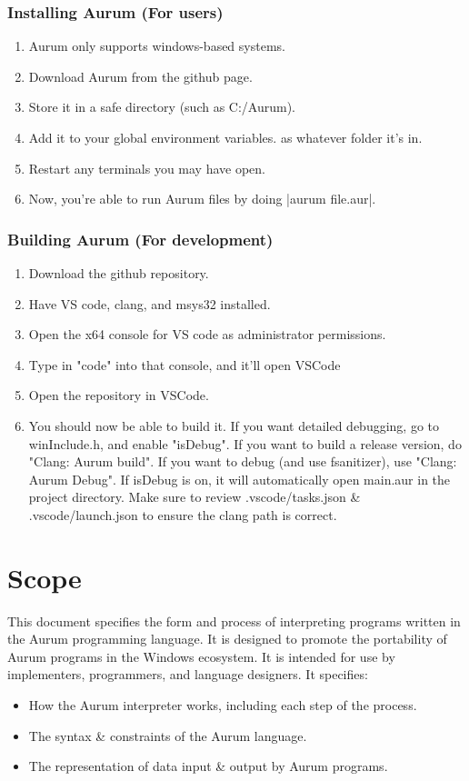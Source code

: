 \documentclass[12pt, letterpaper, oneside]{article}
\begin{document}
		\subsubsection{Installing Aurum (For users)}
		\begin{enumerate}
			\item Aurum only supports windows-based systems.
			\item Download Aurum from the github page.
			\item Store it in a safe directory (such as C:/Aurum).
			\item Add it to your global environment variables. as whatever folder it's in.
			\item Restart any terminals you may have open.
			\item Now, you're able to run Aurum files by doing \spverb|aurum file.aur|.
		\end{enumerate}
		\subsubsection{Building Aurum (For development)}
		\begin{enumerate}
			\item Download the github repository.
			\item Have VS code, clang, and msys32 installed.
			\item Open the x64 console for VS code as administrator permissions.
			\item Type in "code" into that console, and it'll open VSCode
			\item Open the repository in VSCode.
			\item You should now be able to build it. If you want detailed debugging, go to winInclude.h, and enable "isDebug". If you want to build a release version, do "Clang: Aurum build". If you want to debug (and use fsanitizer), use "Clang: Aurum Debug". If isDebug is on, it will automatically open main.aur in the project directory. Make sure to review .vscode/tasks.json \& .vscode/launch.json to ensure the clang path is correct.
		\end{enumerate} 
	\newpage
	\setcounter{page}{1}
	\renewcommand{\thepage}{\arabic{page}}
	\section{Scope}
	This document specifies the form and process of interpreting programs written in the Aurum programming language. It is designed to promote the portability of Aurum programs in the Windows ecosystem. It is intended for use by implementers, programmers, and language designers. It specifies:
	\begin{itemize}
		\item How the Aurum interpreter works, including each step of the process.
		\item The syntax \& constraints of the Aurum language.
		\item The representation of data input \& output by Aurum programs.
	\end{itemize}
\end{document}
